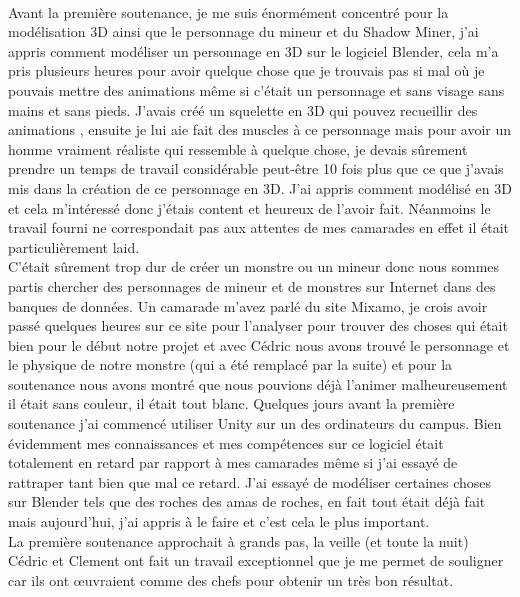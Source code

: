 \documentclass[titlepage, 13px, a4paper]{report}
\begin{document}
\paragraph{} \hspace{0pt}
Avant la première soutenance, je me suis énormément concentré pour la modélisation 3D ainsi que le personnage 
du mineur et du Shadow Miner, j’ai appris comment modéliser un personnage en 3D sur le logiciel Blender, 
cela m’a pris plusieurs heures pour avoir quelque chose que je trouvais pas si mal où je pouvais mettre 
des animations même si c’était un personnage et sans visage sans mains et sans pieds. J’avais créé un squelette 
en 3D qui pouvez recueillir des animations , ensuite je lui aie fait des muscles à ce personnage mais pour 
avoir un homme vraiment réaliste qui ressemble à quelque chose, je devais sûrement prendre un temps de travail 
considérable peut-être 10 fois plus que ce que j’avais mis dans la création de ce personnage en 3D. 
J’ai appris comment modélisé en 3D et cela m’intéressé donc j’étais content et heureux de l’avoir fait. 
Néanmoins le travail fourni ne correspondait pas aux attentes de mes camarades en effet il était particulièrement 
laid. \\
C’était sûrement trop dur de créer un monstre 
ou un mineur donc nous sommes partis chercher des personnages de mineur et de monstres sur Internet dans des 
banques de données. Un camarade m’avez parlé du site Mixamo, je crois avoir passé quelques heures sur ce site 
pour l’analyser pour trouver des choses qui était bien pour le début notre projet et avec Cédric nous avons 
trouvé le personnage et le physique de notre monstre (qui a été remplacé par la suite) et pour la soutenance nous 
avons montré que nous pouvions déjà l’animer malheureusement il était sans couleur, il était tout blanc. 
Quelques jours avant la première soutenance j’ai commencé utiliser Unity sur un des ordinateurs du campus. 
Bien évidemment mes connaissances et mes compétences sur ce logiciel était totalement en retard par rapport à mes 
camarades même si j’ai essayé de rattraper tant bien que mal ce retard. J’ai essayé de modéliser certaines 
choses sur Blender tels que des roches des amas de roches, en fait tout était déjà fait mais aujourd’hui, 
j’ai appris à le faire et c’est cela le plus important. \\
La première soutenance approchait à grands pas, 
la veille (et toute la nuit) Cédric et Clement ont fait un travail exceptionnel que je me permet de souligner car ils ont œuvraient 
comme des chefs pour obtenir un très bon résultat. \\
\end{document}
